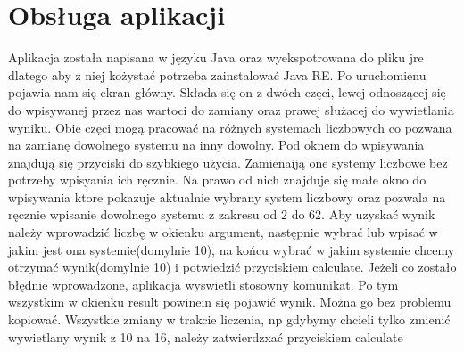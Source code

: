 \documentclass[11pt,a4paper]{article}
\begin{document}
\section{Obsługa aplikacji}
Aplikacja została napisana w języku Java oraz wyekspotrowana do pliku jre dlatego aby z niej kożystać potrzeba zainstalować Java RE. Po uruchomienu pojawia nam się ekran główny. Składa się on z dwóch częci, lewej odnoszącej się do wpisywanej przez nas wartoci do zamiany oraz prawej służacej do wywietlania wyniku. Obie częci mogą pracować na różnych systemach liczbowych co pozwana na zamianę dowolnego systemu na inny dowolny. Pod oknem do wpisywania znajdują się przyciski do szybkiego użycia. Zamienaiją one systemy liczbowe bez potrzeby wpisyania ich ręcznie. Na prawo od nich znajduje się małe okno do wpisywania ktore pokazuje aktualnie wybrany system liczbowy oraz pozwala na ręcznie wpisanie dowolnego systemu z zakresu od 2 do 62. Aby uzyskać wynik należy wprowadzić liczbę w okienku argument, następnie wybrać lub wpisać w jakim jest ona systemie(domylnie 10), na końcu wybrać w jakim systemie chcemy otrzymać wynik(domylnie 10) i potwiedzić przyciskiem calculate. Jeżeli co zostało błędnie wprowadzone, aplikacja wyswietli stosowny komunikat. Po tym wszystkim w okienku result powinein się pojawić wynik. Można go bez problemu kopiować. Wszystkie zmiany w trakcie liczenia, np gdybymy chcieli tylko zmienić wywietlany wynik z 10 na 16,  należy zatwierdzxać przyciskiem calculate
\end{document}
